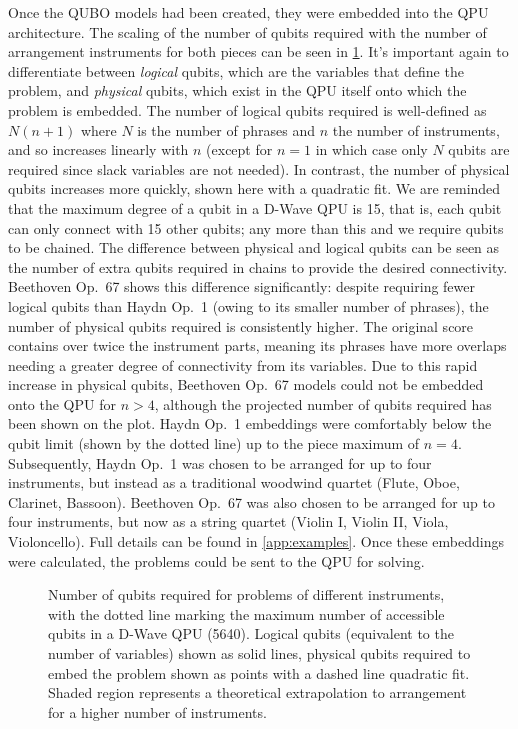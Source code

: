 \documentclass[12pt]{article}
\theoremstyle{definition}
\begin{document}
Once the QUBO models had been created, they were embedded into the QPU architecture. The scaling of the number of qubits required with the number of arrangement instruments for both pieces can be seen in \cref{fig:qubits}. It's important again to differentiate between \emph{logical} qubits, which are the variables that define the problem, and \emph{physical} qubits, which exist in the QPU itself onto which the problem is embedded. The number of logical qubits required is well-defined as $N(n+1)$ where $N$ is the number of phrases and $n$ the number of instruments, and so increases linearly with $n$ (except for $n=1$ in which case only $N$ qubits are required since slack variables are not needed). In contrast, the number of physical qubits increases more quickly, shown here with a quadratic fit. We are reminded that the maximum degree of a qubit in a D-Wave QPU is \num{15}, that is, each qubit can only connect with \num{15} other qubits; any more than this and we require qubits to be chained. The difference between physical and logical qubits can be seen as the number of extra qubits required in chains to provide the desired connectivity. Beethoven Op.\ 67 shows this difference significantly: despite requiring fewer logical qubits than Haydn Op.\ 1 (owing to its smaller number of phrases), the number of physical qubits required is consistently higher. The original score contains over twice the instrument parts, meaning its phrases have more overlaps needing a greater degree of connectivity from its variables. Due to this rapid increase in physical qubits, Beethoven Op.\ 67 models could not be embedded onto the QPU for $n>4$, although the projected number of qubits required has been shown on the plot. Haydn Op.\ 1 embeddings were comfortably below the qubit limit (shown by the dotted line) up to the piece maximum of $n=4$. Subsequently, Haydn Op.\ 1 was chosen to be arranged for up to four instruments, but instead as a traditional woodwind quartet (Flute, Oboe, Clarinet, Bassoon). Beethoven Op.\ 67 was also chosen to be arranged for up to four instruments, but now as a string quartet (Violin I, Violin II, Viola, Violoncello). Full details can be found in \cref{app:examples}. Once these embeddings were calculated, the problems could be sent to the QPU for solving.

\begin{figure}[ht]
    \centering\footnotesize
    
    \caption[Number of qubits required for problems of different instruments.]{Number of qubits required for problems of different instruments, with the dotted line marking the maximum number of accessible qubits in a D-Wave QPU (\num{5640}). Logical qubits (equivalent to the number of variables) shown as solid lines, physical qubits required to embed the problem shown as points with a dashed line quadratic fit. Shaded region represents a theoretical extrapolation to arrangement for a higher number of instruments.}
    \label{fig:qubits}
\end{figure}
\end{document}
